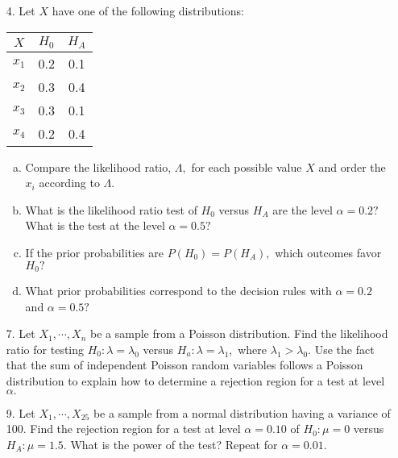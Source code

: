 \documentclass{article}
\begin{document}
\begin{itemize}
	\item[4.] Let $X$ have one of the following distributions:
		\begin{center}
			\begin{tabular}{ccc}
				$X$ & $H_0$ & $H_A$ \\
				\hline
				$x_1$ & 0.2 & 0.1 \\
				$x_2$ & 0.3 & 0.4 \\
				$x_3$ & 0.3 & 0.1 \\
				$x_4$ & 0.2 & 0.4
			\end{tabular}
		\end{center}

		\begin{enumerate}[a.]
			\item Compare the likelihood ratio, $\Lambda,$ for each possible value $X$ and order the $x_i$ according to $\Lambda.$

			\item What is the likelihood ratio test of $H_0$ versus $H_A$ are the level $\alpha=0.2?$ What is the test at the level $\alpha=0.5?$

			\item If the prior probabilities are $P(H_0)=P(H_A),$ which outcomes favor $H_0?$

			\item What prior probabilities correspond to the decision rules with $\alpha=0.2$ and $\alpha=0.5?$
				
		\end{enumerate}

	\item[7.] Let $X_1, \cdots, X_n$ be a sample from a Poisson distribution. Find the likelihood ratio for testing $H_0:\lambda=\lambda_0$ versus $H_a:\lambda=\lambda_1,$ where $\lambda_1>\lambda_0.$ Use the fact that the sum of independent Poisson random variables follows a Poisson distribution to explain how to determine a rejection region for a test at level $\alpha.$

	\item[9.] Let $X_1,\cdots, X_{25}$ be a sample from a normal distribution having a variance of 100. Find the rejection region for a test at level $\alpha=0.10$ of $H_0:\mu=0$ versus $H_A: \mu=1.5.$ What is the power of the test? Repeat for $\alpha=0.01.$
		
\end{itemize}
\end{document}
